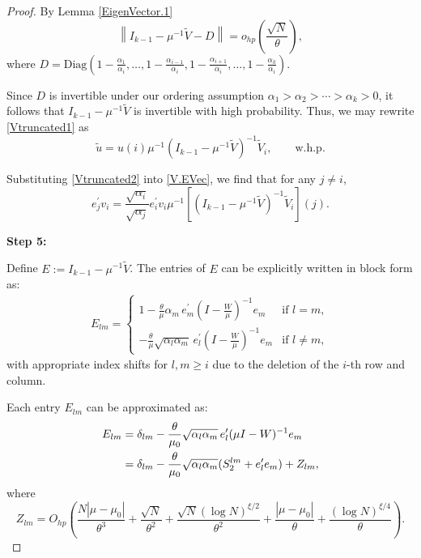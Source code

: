 \documentclass[11pt, reqno]{amsart}
\numberwithin{equation}{section}
\begin{document}
\begin{proof}
By Lemma \ref{EigenVector.1}
\[
\left\| I_{k-1} - \mu^{-1}\tilde V - D \right\| = o_{hp}\left( \frac{\sqrt{N}}{\theta} \right),
\]
where $D = \mathrm{Diag}\left(1 - \frac{\alpha_1}{\alpha_i}, \ldots, 1 - \frac{\alpha_{i-1}}{\alpha_i}, 1 - \frac{\alpha_{i+1}}{\alpha_i}, \ldots, 1 - \frac{\alpha_k}{\alpha_i} \right)$.

Since $D$ is invertible under our ordering assumption $\alpha_1 > \alpha_2 > \cdots > \alpha_k > 0$, it follows that $I_{k-1} - \mu^{-1}\tilde V$ is invertible with high probability. Thus, we may rewrite \eqref{Vtruncated1} as
\begin{equation}\label{Vtruncated2}
\tilde u = u(i)\mu^{-1}\left(I_{k-1} - \mu^{-1} \tilde V\right)^{-1}\tilde V_i, \qquad \text{w.h.p.}
\end{equation}

Substituting \eqref{Vtruncated2} into \eqref{V.EVec}, we find that for any $j \ne i$,
\begin{equation}\label{EigenSp.dim1}
e_j^\prime v_i = \frac{\sqrt{\alpha_i}}{\sqrt{\alpha_j}} e_i^\prime v_i \mu^{-1} \left[ \left(I_{k-1} - \mu^{-1} \tilde V \right)^{-1} \tilde V_i \right](j).
\end{equation}

\textbf{Step 5:}

Define $E := I_{k-1} - \mu^{-1}\tilde V$. The entries of $E$ can be explicitly written in block form as:
\begin{align*}
E_{lm} = 
\begin{cases}
1 - \frac{\theta}{\mu} \alpha_m\, e_m^\prime\left(I - \frac{W}{\mu}\right)^{-1}e_m & \text{if } l = m, \\
- \frac{\theta}{\mu} \sqrt{\alpha_l \alpha_m}\, e_l^\prime\left(I - \frac{W}{\mu}\right)^{-1}e_m & \text{if } l \ne m,
\end{cases}
\end{align*}
with appropriate index shifts for $l,m \ge i$ due to the deletion of the $i$-th row and column.

Each entry $E_{lm}$ can be approximated as:
\begin{align}
E_{lm} 
&= \delta_{lm} - \frac{\theta}{\mu_0} \sqrt{\alpha_l \alpha_m}\, e_l^\prime (\mu I - W)^{-1} e_m \notag \\
&= \delta_{lm} - \frac{\theta}{\mu_0} \sqrt{\alpha_l \alpha_m}(S_2^{lm} + e_l^\prime e_m) + Z_{lm}, \label{Det.Approx1}
\end{align}
where
\[
Z_{lm} = O_{hp}\left( \frac{N|\mu - \mu_0|}{\theta^3} + \frac{\sqrt{N}}{\theta^2} + \frac{\sqrt{N}(\log N)^{\xi/2}}{\theta^2} + \frac{|\mu - \mu_0|}{\theta} + \frac{(\log N)^{\xi/4}}{\theta} \right).
\]


\end{proof}
\end{document}
